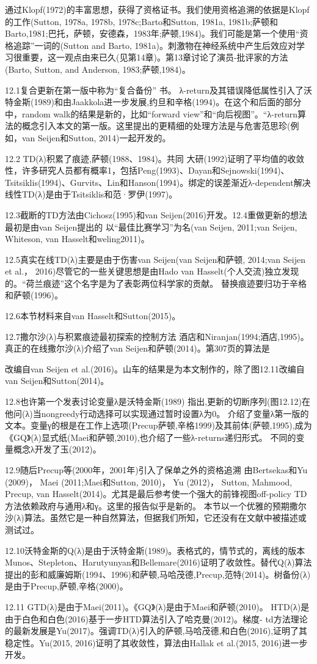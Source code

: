 通过Klopf(1972)的丰富思想，获得了资格证书。我们使用资格追溯的依据是Klopf的工作(Sutton, 1978a, 1978b, 1978c;Barto和Sutton, 1981a, 1981b;萨顿和Barto,1981;巴托，萨顿，安德森，1983年;萨顿,1984)。我们可能是第一个使用“资格追踪”一词的(Sutton and Barto, 1981a)。刺激物在神经系统中产生后效应对学习很重要，这一观点由来已久(见第14章)。第13章讨论了演员-批评家的方法(Barto, Sutton, and Anderson, 1983;萨顿,1984)。

12.1复合更新在第一版中称为“复合备份”
书。
λ-return及其错误降低属性引入了沃特金斯(1989)和由Jaakkola进一步发展,约旦和辛格(1994)。在这个和后面的部分中，random walk的结果是新的，比如“forward view”和“向后视图”。“λ-return算法的概念引入本文的第一版。这里提出的更精细的处理方法是与危害范思珍(例如，van Seijen和Sutton, 2014)一起开发的。

12.2 TD(λ)积累了痕迹,萨顿(1988、1984)。共同
大研(1992)证明了平均值的收敛性，许多研究人员都有概率1，包括Peng(1993)、Dayan和Sejnowski(1994)、Tsitsiklis(1994)、Gurvits、Lin和Hanson(1994)。绑定的误差渐近λ-dependent解决线性TD(λ)是由于Tsitsiklis和范·罗伊(1997)。

12.3截断的TD方法由Cichosz(1995)和van Seijen(2016)开发。12.4重做更新的想法最初是由van Seijen提出的
以“最佳比赛学习”为名(van Seijen, 2011;van Seijen, Whiteson, van Hasselt和weling2011)。

12.5真实在线TD(λ)主要是由于伤害van Seijen(van Seijen和萨顿,
2014;van Seijen et al.， 2016)尽管它的一些关键思想是由Hado van Hasselt(个人交流)独立发现的。“荷兰痕迹”这个名字是为了表彰两位科学家的贡献。
替换痕迹要归功于辛格和萨顿(1996)。

12.6本节材料来自van Hasselt和Sutton(2015)。

12.7撒尔沙(λ)与积累痕迹最初探索的控制方法
酒店和Niranjan(1994;酒店,1995)。真正的在线撒尔沙(λ)介绍了van Seijen和萨顿(2014)。第307页的算法是

改编自van Seijen et al.(2016)。山车的结果是为本文制作的，除了图12.11改编自van Seijen和Sutton(2014)。

12.8也许第一个发表讨论变量λ是沃特金斯(1989)
指出,更新的切断序列(图12.12)在他问(λ)当nongreedy行动选择可以实现通过暂时设置λ为0。
介绍了变量λ第一版的文本。变量γ的根是在工作上选项(Precup萨顿,辛格1999)及其前体(萨顿,1995),成为《GQ》(λ)显式纸(Maei和萨顿,2010),也介绍了一些λ-returns递归形式。
不同的变量概念λ开发了玉(2012)。

12.9随后Precup等(2000年，2001年)引入了保单之外的资格追溯
由Bertsekas和Yu (2009)， Maei (2011;Maei和Sutton, 2010)， Yu (2012)， Sutton, Mahmood, Precup, van Hasselt(2014)。尤其是最后参考使一个强大的前锋视图off-policy TD方法依赖政府与通用λ和γ。这里的报告似乎是新的。
本节以一个优雅的预期撒尔沙(λ)算法。虽然它是一种自然算法，但据我们所知，它还没有在文献中被描述或测试过。

12.10沃特金斯的Q(λ)是由于沃特金斯(1989)。表格式的，情节式的，离线的版本
Munos、Stepleton、Harutyunyan和Bellemare(2016)证明了收敛性。替代Q(λ)算法提出的彭和威廉姆斯(1994、1996)和萨顿,马哈茂德,Precup,范特(2014)。树备份(λ)是由于Precup,萨顿,辛格(2000)。

12.11 GTD(λ)是由于Maei(2011)。《GQ》(λ)是由于Maei和萨顿(2010)。
HTD(λ)是由于白色和白色(2016)基于一步HTD算法引入了哈克曼(2012)。梯度- td方法理论的最新发展是Yu(2017)。强调TD(λ)引入的萨顿,马哈茂德,和白色(2016),证明了其稳定性。Yu(2015, 2016)证明了其收敛性，算法由Hallak et al.(2015, 2016)进一步开发。

